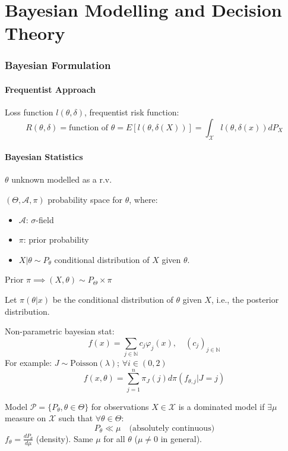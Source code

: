 \documentclass[11pt, a4paper]{article}
\begin{document}
\part{Bayesian Modelling and Decision Theory}

\section{Bayesian Formulation}

\subsection{Frequentist Approach}
Loss function $l(\theta, \delta)$, frequentist risk function:
\[ R(\theta,\delta) = \text{function of } \theta = E[l(\theta,\delta(X))] = \int_{\mathcal{X}} l(\theta,\delta(x)) dP_X \]

\subsection{Bayesian Statistics}
$\theta$ unknown modelled as a r.v.

$(\Theta, \mathcal{A}, \pi)$ probability space for $\theta$, where:
\begin{itemize}
    \item $\mathcal{A}$: $\sigma$-field
    \item $\pi$: prior probability
    \item $X|\theta \sim P_{\theta}$ conditional distribution of $X$ given $\theta$.
\end{itemize}
Prior $\pi \implies (X, \theta) \sim P_{\Theta} \times \pi$

\begin{example}
Let $\pi(\theta|x)$ be the conditional distribution of $\theta$ given $X$, i.e., the posterior distribution.

Non-parametric bayesian stat:
\[ f(x) = \sum_{j \in \mathbb{N}} c_j \varphi_j(x), \quad (c_j)_{j \in \mathbb{N}} \]
For example:
$J \sim \text{Poisson}(\lambda)$; $\forall i \in (0,2)$
\[ f(x, \theta) = \sum_{j=1}^{n} \pi_J(j) d\pi(f_{\theta,j}|J=j) \]
\end{example}

\begin{definition}
Model $\mathcal{P} = \{P_\theta, \theta \in \Theta\}$ for observations $X \in \mathcal{X}$ is a dominated model if $\exists \mu$ measure on $\mathcal{X}$ such that $\forall \theta \in \Theta$:
\[ P_\theta \ll \mu \quad \text{(absolutely continuous)} \]
$f_\theta = \frac{dP_\theta}{d\mu}$ (density). Same $\mu$ for all $\theta$ ($\mu \neq 0$ in general).
\end{definition}
\end{document}
